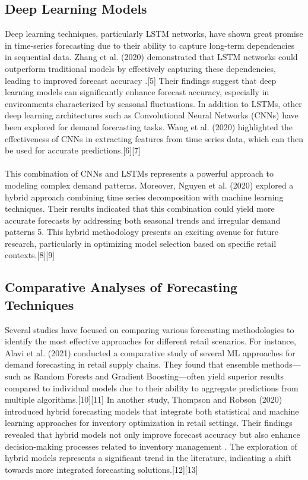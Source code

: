 \documentclass[10pt]{report}
\begin{document}
\begin{center}
\subsection{Deep Learning Models}\label{AA}
Deep learning techniques, particularly LSTM networks, have shown great promise in time-series forecasting due to their ability to capture long-term dependencies in sequential data. Zhang et al. (2020) demonstrated that LSTM networks could outperform traditional models by effectively capturing these dependencies, leading to improved forecast accuracy .[5] Their findings suggest that deep learning models can significantly enhance forecast accuracy, especially in environments characterized by seasonal fluctuations.
In addition to LSTMs, other deep learning architectures such as Convolutional Neural Networks (CNNs) have been explored for demand forecasting tasks. Wang et al. (2020) highlighted the effectiveness of CNNs in extracting features from time series data, which can then be used for accurate predictions.[6][7]\\
\\
This combination of CNNs and LSTMs represents a powerful approach to modeling complex demand patterns.
Moreover, Nguyen et al. (2020) explored a hybrid approach combining time series decomposition with machine learning techniques. Their results indicated that this combination could yield more accurate forecasts by addressing both seasonal trends and irregular demand patterns 5. This hybrid methodology presents an exciting avenue for future research, particularly in optimizing model selection based on specific retail contexts.[8][9]
\subsection{Comparative Analyses of Forecasting Techniques}\label{AA}
Several studies have focused on comparing various forecasting methodologies to identify the most effective approaches for different retail scenarios. For instance, Alavi et al. (2021) conducted a comparative study of several ML approaches for demand forecasting in retail supply chains. They found that ensemble methods—such as Random Forests and Gradient Boosting—often yield superior results compared to individual models due to their ability to aggregate predictions from multiple algorithms.[10][11]
In another study, Thompson and Robson (2020) introduced hybrid forecasting models that integrate both statistical and machine learning approaches for inventory optimization in retail settings. Their findings revealed that hybrid models not only improve forecast accuracy but also enhance decision-making processes related to inventory management . The exploration of hybrid models represents a significant trend in the literature, indicating a shift towards more integrated forecasting solutions.[12][13]

\end{center}
\end{document}
